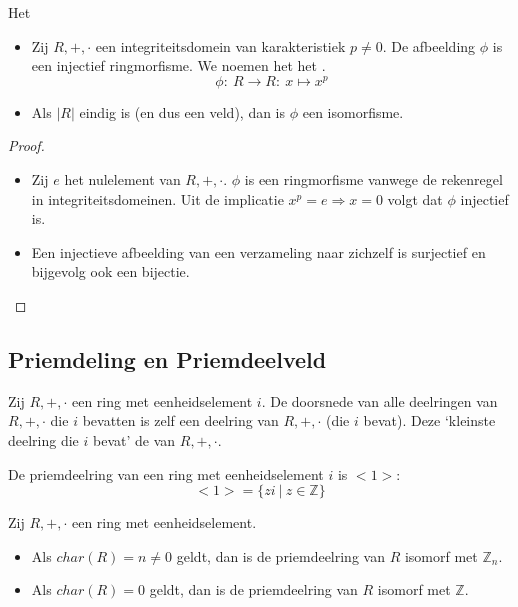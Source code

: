 \documentclass[main.tex]{subfiles}
\begin{document}
\begin{st}
  Het \\
  \begin{itemize}
  \item Zij $R,+,\cdot$ een integriteitsdomein van karakteristiek $p\neq 0$.
    De afbeelding $\phi$ is een injectief ringmorfisme.
    We noemen het het .
    \[ \phi:\ R \rightarrow R:\ x \mapsto x^{p} \]
  \item Als $|R|$ eindig is (en dus een veld), dan is $\phi$ een isomorfisme.
  \end{itemize}

  \begin{proof}
    \begin{itemize}
    \item Zij $e$ het nulelement van $R,+,\cdot$.  $\phi$ is een
      ringmorfisme vanwege de rekenregel in
      integriteitsdomeinen.
      Uit de implicatie $x^{p} = e \Rightarrow x = 0$ volgt dat $\phi$
      injectief is.  
    \item Een injectieve afbeelding van een verzameling naar zichzelf is surjectief en bijgevolg ook een bijectie. 
    \end{itemize}
  \end{proof}
\end{st}

\subsection{Priemdeling en Priemdeelveld}
\label{sec:priemd-en-priemd}

\begin{de}
  Zij $R,+,\cdot$ een ring met eenheidselement $i$.
  De doorsnede van alle deelringen van $R,+,\cdot$ die $i$ bevatten is zelf een deelring van $R,+,\cdot$ (die $i$ bevat).
  Deze `kleinste deelring die $i$ bevat' de  van $R,+,\cdot$.
\end{de}

\begin{ei}
  De priemdeelring van een ring met eenheidselement $i$ is $<1>$:
  \[ <1> = \{ zi \ |\ z \in \mathbb{Z} \} \]
\end{ei}

\begin{st}
  Zij $R,+,\cdot$ een ring met eenheidselement.
  \begin{itemize}
  \item Als $char(R) = n \neq 0$ geldt, dan is de priemdeelring van $R$ isomorf met $\mathbb{Z}_{n}$.
  \item Als $char(R) = 0$ geldt, dan is de priemdeelring van $R$ isomorf met $\mathbb{Z}$.
  \end{itemize}
\end{st}
\end{document}
